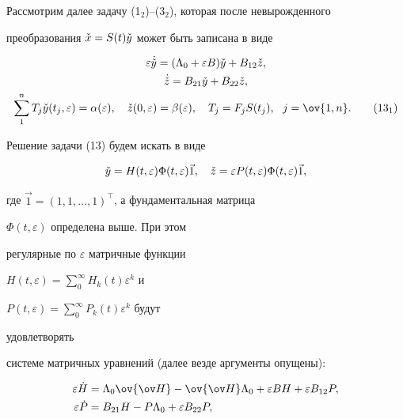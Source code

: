  


Рассмотрим далее задачу (1$_2$)--(3$_2$), которая после невырожденного 


преобразования $\Check x=S(t)\check y$ может быть записана в виде 


\begin{gather} 


\varepsilon\DC{y}=(\Lambda_0+\varepsilon B)\Check y 


+B_{12}\check z,\\ 


% 


\DC{z}=B_{21}\Check y+B_{22}\Check z,\notag \\ 


\sum^n_1 T_j\Check y(t_j,\varepsilon)=\alpha(\varepsilon),\quad 


\Check z(0,\varepsilon)=\beta(\varepsilon),\quad 


T_j=F_j S(t_j),\ \ j=\ov{1,n}.\tag{13$_1$} 


\end{gather} 


Решение задачи (13) будем искать в виде 


$$ 


\Check y=H(t,\varepsilon)\Phi(t,\varepsilon)\Vec 1,\quad 


\Check z=\varepsilon P(t,\varepsilon) 


\Phi(t,\varepsilon)\Vec 1, 


$$ 


где $\Vec 1=(1,1,\dotsc,1)^\top$, а фундаментальная матрица 


$\Phi(t,\varepsilon)$ определена выше. При этом 


регулярные по $\varepsilon$ матричные функции 


$H(t,\varepsilon)=\sum\limits^\infty_0H_k(t)\varepsilon^k$ и 


$P(t,\varepsilon)=\sum\limits^\infty_0P_k(t)\varepsilon^k$ будут 


удовлетворять 


системе матричных уравнений (далее везде аргументы опущены): 


\begin{equation} 


\begin{split} 


\varepsilon\Dot H&=\Lambda_0\ov{\ov H}-\ov{\ov H}\Lambda_0 


+\varepsilon B H+\varepsilon B_{12}P,\\ 


% 


\varepsilon\Dot P&=B_{21}H-P\Lambda_0+ 


\varepsilon B_{22}P, 


\end{split} 


\end{equation} 


